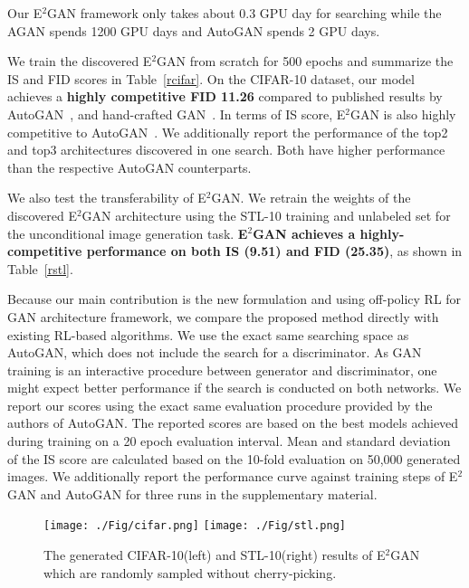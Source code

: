 \documentclass[runningheads]{llncs}
\begin{document}
Our E$^2$GAN framework only takes about 0.3 GPU day for searching while the AGAN spends 1200 GPU days and AutoGAN spends 2 GPU days.

We train the discovered E$^2$GAN from scratch for 500 epochs and summarize the IS and FID scores in Table~\ref{rcifar}.  On the CIFAR-10 dataset, our model achieves a  \textbf{highly competitive FID 11.26} compared to published results by AutoGAN~\cite{gong2019autogan}, and hand-crafted GAN~\cite{radford2015unsupervised,salimans2016improved,yang2017lr,warde2016improving,he2019probgan,gulrajani2017improved,grinblat2017class,miyato2018spectral,hoang2018mgan,wang2018improving}. In terms of IS score, E$^2$GAN is also highly competitive to AutoGAN~\cite{gong2019autogan}. We additionally report the performance of the top2 and top3 architectures discovered in one search. Both have higher performance than the respective AutoGAN counterparts.





We also test the transferability of E$^2$GAN. We retrain the weights of the discovered E$^2$GAN architecture using the STL-10 training and unlabeled set for the unconditional image generation task. \textbf{E$^2$GAN achieves a highly-competitive performance on both IS (9.51) and FID (25.35)}, as shown in Table~\ref{rstl}.


Because our main contribution is the new formulation and using off-policy RL for GAN architecture framework, we compare the proposed method directly with existing RL-based algorithms. We use the exact same searching space as AutoGAN, which does not include the search for a discriminator. As GAN training is an interactive procedure between generator and discriminator, one might expect better performance if the search is conducted on both networks. We report our scores using the exact same evaluation procedure provided by the authors of AutoGAN. The reported scores are based on the best models achieved during training on a 20 epoch evaluation interval. Mean and standard deviation of the IS score are calculated based on the 10-fold evaluation on 50,000 generated images. We additionally report the performance curve against training steps of E$^2$GAN and AutoGAN for three runs in the supplementary material.

\begin{figure}[t]
\centering
\texttt{[image: ./Fig/cifar.png]}
\texttt{[image: ./Fig/stl.png]}\caption{The generated CIFAR-10(left) and STL-10(right) results of E$^2$GAN which are randomly sampled without cherry-picking.}
\label{fig4}
\end{figure}
\end{document}
